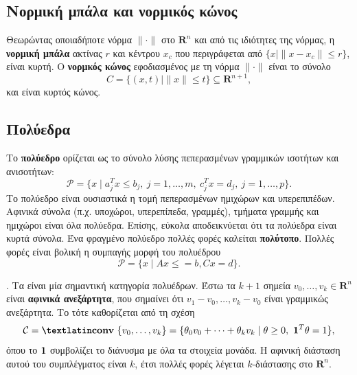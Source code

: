 \subsection{Νορμική μπάλα και νορμικός κώνος} Θεωρώντας οποιαδήποτε νόρμα
$\| \cdot \|$ στο $\mathbf{R}^n$ και από τις ιδιότητες της νόρμας, η
\textbf{νορμική μπάλα} ακτίνας $r$ και κέντρου $x_c$ που περιγράφεται από
$\{ x \mid \|x - x_c\| \leq r\}$, είναι κυρτή. Ο \textbf{νορμκός κώνος}
εφοδιασμένος με τη νόρμα $\| \cdot \|$ είναι το σύνολο
\begin{equation*}
    C = \{(x,t) \mid \|x\| \leq t\} \subseteq \mathbf{R}^{n+1},
\end{equation*}
και είναι κυρτός κώνος.

\subsection{Πολύεδρα} Το \textbf{πολύεδρο} ορίζεται ως το σύνολο λύσης πεπερασμένων
γραμμικών ισοτήτων και ανισοτήτων:
\begin{equation*}
    \mathcal{P} = \{x \mid a_j^T x \leq b_j,\ j = 1, \dots, m,\ c_j^T x = d_j,\
    j = 1, \dots, p \}.
\end{equation*}
Το πολύεδρο είναι ουσιαστικά η τομή πεπερασμένων ημιχώρων και υπερεπιπέδων.
Αφινικά σύνολα (π.χ. υποχώροι, υπερεπίπεδα, γραμμές), τμήματα γραμμής και
ημιχώροι είναι όλα πολύεδρα. Επίσης, εύκολα αποδεικνύεται ότι τα πολύεδρα είναι
κυρτά σύνολα. Ένα φραγμένο πολύεδρο πολλές φορές καλείται \textbf{πολύτοπο}.
Πολλές φορές είναι βολική η συμπαγής μορφή του πολυέδρου
\begin{equation*}
    \mathcal{P} = \{x \mid Ax \leq = b, Cx = d\}.
\end{equation*}

\textbf{}. Τα \textbf{} είναι μία
σημαντική κατηγορία πολυέδρων. Έστω τα $k + 1$ σημεία $v_0, \dots, v_k \in
\mathbf{R}^n$ είναι \textbf{αφινικά ανεξάρτητα}, που σημαίνει ότι $v_1 - v_0, \dots,
v_k - v_0$ είναι γραμμικώς ανεξάρτητα. Το \tl{simplex} τότε καθορίζεται από τη σχέση
\begin{equation*}
    \mathcal{C} = \textbf{\tl{conv}}\ \{v_0, \dots, v_k\} =
    \{ \theta_0 v_0 + \dots + \theta_k v_k \mid \theta \geq 0,\ \vc{1}^T\theta
    = 1\},
\end{equation*}
όπου το $\bm{1}$ συμβολίζει το διάνυσμα με όλα τα στοιχεία μονάδα. Η αφινική
διάσταση αυτού του συμπλέγματος είναι $k$, έτσι πολλές φορές λέγεται
$k$-διάστασης \tl{simplex} στο $\mathbf{R}^n$.

